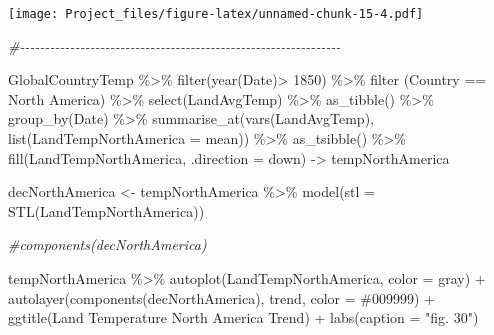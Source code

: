 \documentclass[
]{article}
\newenvironment{Shaded}{\begin{snugshade}}{\end{snugshade}}
\newcommand{\AttributeTok}[1]{\textcolor[rgb]{0.77,0.63,0.00}{#1}}
\newcommand{\CommentTok}[1]{\textcolor[rgb]{0.56,0.35,0.01}{\textit{#1}}}
\newcommand{\DecValTok}[1]{\textcolor[rgb]{0.00,0.00,0.81}{#1}}
\newcommand{\FunctionTok}[1]{\textcolor[rgb]{0.00,0.00,0.00}{#1}}
\newcommand{\NormalTok}[1]{#1}
\newcommand{\OtherTok}[1]{\textcolor[rgb]{0.56,0.35,0.01}{#1}}
\newcommand{\SpecialCharTok}[1]{\textcolor[rgb]{0.00,0.00,0.00}{#1}}
\newcommand{\StringTok}[1]{\textcolor[rgb]{0.31,0.60,0.02}{#1}}
\begin{document}
\texttt{[image: Project\_files/figure-latex/unnamed-chunk-15-4.pdf]}

\begin{Shaded}
\begin{Highlighting}[]
\CommentTok{\#{-}{-}{-}{-}{-}{-}{-}{-}{-}{-}{-}{-}{-}{-}{-}{-}{-}{-}{-}{-}{-}{-}{-}{-}{-}{-}{-}{-}{-}{-}{-}{-}{-}{-}{-}{-}{-}{-}{-}{-}{-}{-}{-}{-}{-}{-}{-}{-}{-}{-}{-}{-}{-}{-}{-}{-}{-}{-}{-}{-}{-}{-}{-}{-}}

\NormalTok{GlobalCountryTemp }\SpecialCharTok{\%\textgreater{}\%}
  \FunctionTok{filter}\NormalTok{(}\FunctionTok{year}\NormalTok{(Date)}\SpecialCharTok{\textgreater{}} \DecValTok{1850}\NormalTok{) }\SpecialCharTok{\%\textgreater{}\%}
  \FunctionTok{filter}\NormalTok{ (Country }\SpecialCharTok{==} \StringTok{\textquotesingle{}North America\textquotesingle{}}\NormalTok{) }\SpecialCharTok{\%\textgreater{}\%}
  \FunctionTok{select}\NormalTok{(LandAvgTemp) }\SpecialCharTok{\%\textgreater{}\%}
  \FunctionTok{as\_tibble}\NormalTok{() }\SpecialCharTok{\%\textgreater{}\%}
  \FunctionTok{group\_by}\NormalTok{(Date) }\SpecialCharTok{\%\textgreater{}\%} 
  \FunctionTok{summarise\_at}\NormalTok{(}\FunctionTok{vars}\NormalTok{(LandAvgTemp), }\FunctionTok{list}\NormalTok{(}\AttributeTok{LandTempNorthAmerica =}\NormalTok{ mean)) }\SpecialCharTok{\%\textgreater{}\%}
  \FunctionTok{as\_tsibble}\NormalTok{() }\SpecialCharTok{\%\textgreater{}\%}
  \FunctionTok{fill}\NormalTok{(LandTempNorthAmerica, }\AttributeTok{.direction =} \StringTok{\textquotesingle{}down\textquotesingle{}}\NormalTok{) }\OtherTok{{-}\textgreater{}}\NormalTok{ tempNorthAmerica}

\NormalTok{decNorthAmerica }\OtherTok{\textless{}{-}}\NormalTok{ tempNorthAmerica }\SpecialCharTok{\%\textgreater{}\%} 
  \FunctionTok{model}\NormalTok{(}\AttributeTok{stl =} \FunctionTok{STL}\NormalTok{(LandTempNorthAmerica))}

\CommentTok{\#components(decNorthAmerica)}

\NormalTok{tempNorthAmerica }\SpecialCharTok{\%\textgreater{}\%}
  \FunctionTok{autoplot}\NormalTok{(LandTempNorthAmerica, }\AttributeTok{color =} \StringTok{\textquotesingle{}gray\textquotesingle{}}\NormalTok{) }\SpecialCharTok{+} 
  \FunctionTok{autolayer}\NormalTok{(}\FunctionTok{components}\NormalTok{(decNorthAmerica), trend, }\AttributeTok{color =} \StringTok{\textquotesingle{}\#009999\textquotesingle{}}\NormalTok{) }\SpecialCharTok{+} 
  \FunctionTok{ggtitle}\NormalTok{(}\StringTok{\textquotesingle{}Land Temperature North America Trend\textquotesingle{}}\NormalTok{) }\SpecialCharTok{+}
  \FunctionTok{labs}\NormalTok{(}\AttributeTok{caption =} \StringTok{"fig. 30"}\NormalTok{)}
\end{Highlighting}
\end{Shaded}
\end{document}
